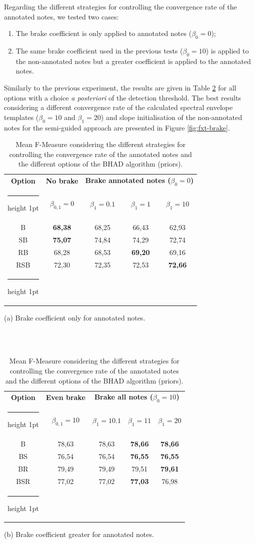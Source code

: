 \documentclass{article}
\makeatletter
\newcommand{\thickhline}{%
    \noalign {\ifnum 0=`}\fi \hrule height 1pt
    \futurelet \reserved@a \@xhline
}
\makeatother
\begin{document}
Regarding the different strategies for controlling the convergence rate of the annotated notes, we tested two cases:

\begin{enumerate}
\item The brake coefficient is only applied to annotated notes ($\beta_0=0$);
\item The same brake coefficient used in the previous tests ($\beta_0=10$) is applied to the non-annotated notes but a greater coefficient is applied to the annotated notes. 
\end{enumerate}
Similarly to the previous experiment, the results are given in Table \ref{tab:brake} for all options with a choice \textit{a posteriori} of the detection threshold. The best results considering a different convergence rate of the calculated spectral envelope templates ($\beta_0=10$ and $\beta_1=20$) and  slope initialisation of the non-annotated notes for the semi-guided approach are presented in Figure \ref{fig:fxt-brake}.


\begin{table}[htb]
\begin{tabular}{ccccc}
\hline
\textbf{Option} & \textbf{No brake} & \multicolumn{3}{c}{\textbf{Brake annotated notes ($\beta_0=0$)}} \\\thickhline
& $\beta_{0,1}=0$ & $\beta_1=0.1$ & $\beta_1=1$ & $\beta_1=10$ \\\hline
B	& \textbf{68,38} &	68,25	& 66,43 &	 62,93 \\
SB	& \textbf{75,07} &	 74,84 	& 74,29 &	 72,74 \\
RB	& 68,28 & 	 68,53 	& \textbf{69,20} & 	 69,16 \\
RSB	& 72,30 &	 72,35 	& 72,53 &	 \textbf{72,66} \\\thickhline
\end{tabular}
  \centerline{(a) Brake coefficient only for annotated notes.}
\\
\\%
\vspace{0.1cm}

\centering
 \begin{tabular}{ccccc}
 \hline
\textbf{Option} & \textbf{Even brake} & \multicolumn{3}{c}{\textbf{Brake all notes ($\beta_0=10$)}} \\\thickhline
& $\beta_{0,1}=10$ & $\beta_1=10.1$ & $\beta_1=11$ & $\beta_1=20$ \\\hline
B	& 78,63 &	78,63 & \textbf{78,66} &	\textbf{78,66} \\
BS	& 76,54 &	 76,54 &	\textbf{76,55} &	\textbf{76,55} \\
BR	& 79,49 &	 79,49 &	79,51 &	\textbf{79,61} \\
BSR	& 77,02 &	 77,02 &	\textbf{77,03} &	76,98 \\\thickhline
\end{tabular}
  \centerline{(b) Brake coefficient greater for annotated notes.}\medskip
\caption{Mean F-Measure considering the different strategies for controlling the convergence rate of the annotated notes and the different options of the BHAD algorithm (priors).}
\label{tab:brake}
\end{table}
\end{document}
